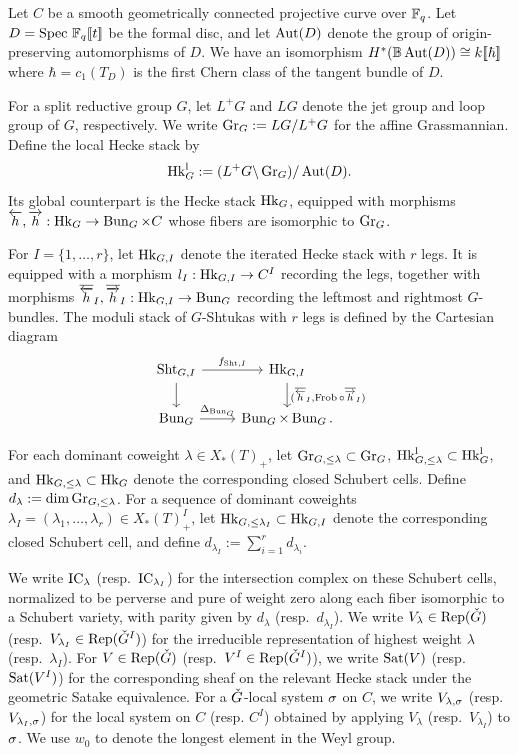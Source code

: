 \documentclass[reqno]{amsart}
\numberwithin{equation}{section}
\numberwithin{equation}{section}
\begin{document}
Let $C$ be a smooth geometrically connected projective curve over $\mathbb{F}_q$. Let $D=\operatorname{Spec\,} \mathbb{F}_q[\![t]\!]$ be the formal disc, and let $\operatorname{Aut}(D)$ denote the group of origin-preserving automorphisms of $D$. We have an isomorphism $H^*(\mathbb{B}\operatorname{Aut}(D))\cong k[\![\hbar]\!]$ where $\hbar=c_1(T_D)$ is the first Chern class of the tangent bundle of $D$.

For a split reductive group $G$, let $L^+G$ and $LG$ denote the jet group and loop group of $G$, respectively. We write $\operatorname{Gr}_G:=LG/L^+G$ for the affine Grassmannian. Define the local Hecke stack by
\[
\operatorname{Hk}_G^{\mathrm{l}}:=(L^+G\backslash \operatorname{Gr}_G)/\operatorname{Aut}(D).
\]
Its global counterpart is the Hecke stack $\operatorname{Hk}_G$, equipped with morphisms $\overleftarrow{h},\overrightarrow{h}:\operatorname{Hk}_G\to \operatorname{Bun}_G\times C$ whose fibers are isomorphic to $\operatorname{Gr}_G$.

For $I=\{1,\dots,r\}$, let $\operatorname{Hk}_{G,I}$ denote the iterated Hecke stack with $r$ legs. It is equipped with a morphism $l_I:\operatorname{Hk}_{G,I}\to C^I$ recording the legs, together with morphisms $\overline{\overleftarrow{h}}_I,\overline{\overrightarrow{h}}_I:\operatorname{Hk}_{G,I}\to \operatorname{Bun}_G$ recording the leftmost and rightmost $G$-bundles. The moduli stack of $G$-Shtukas with $r$ legs is defined by the Cartesian diagram
\[
\begin{tikzcd}
    \Sht_{G,I} \ar[r, "f_{\Sht,I}"] \ar[d]
    & \Hk_{G,I} \ar[d, "{(\overline{\lh}_I,\Frob\circ \overline{\rh}_I)}"] \\
    \Bun_G \ar[r, "\Delta_{\Bun_G}"]
    & \Bun_G\times\Bun_G.
\end{tikzcd}
\]

For each dominant coweight $\lambda\in X_*(T)_+$, let $\operatorname{Gr}_{G,\leq\lambda}\subset \operatorname{Gr}_G$, $\operatorname{Hk}_{G,\leq \lambda}^{\mathrm{l}}\subset \operatorname{Hk}_G^{\mathrm{l}}$, and $\operatorname{Hk}_{G,\leq\lambda}\subset \operatorname{Hk}_G$ denote the corresponding closed Schubert cells. Define $d_{\lambda}:=\dim \operatorname{Gr}_{G,\leq\lambda}$. For a sequence of dominant coweights $\lambda_I=(\lambda_1,\dots,\lambda_r)\in X_*(T)_+^I$, let $\operatorname{Hk}_{G,\leq\lambda_I}\subset \operatorname{Hk}_{G,I}$ denote the corresponding closed Schubert cell, and define $d_{\lambda_I}:=\sum_{i=1}^r d_{\lambda_i}$.

We write $\operatorname{IC}_{\lambda}$ (resp.\ $\operatorname{IC}_{\lambda_I}$) for the intersection complex on these Schubert cells, normalized to be perverse and pure of weight zero along each fiber isomorphic to a Schubert variety, with parity given by $d_{\lambda}$ (resp.\ $d_{\lambda_I}$). We write $V_{\lambda}\in \operatorname{Rep}(\check{G})$ (resp.\ $V_{\lambda_I}\in \operatorname{Rep}(\check{G}^I)$) for the irreducible representation of highest weight $\lambda$ (resp.\ $\lambda_I$). For $V\in \operatorname{Rep}(\check{G})$ (resp.\ $V^I\in \operatorname{Rep}(\check{G}^I)$), we write $\operatorname{Sat}(V)$ (resp.\ $\operatorname{Sat}(V^I)$) for the corresponding sheaf on the relevant Hecke stack under the geometric Satake equivalence. For a $\check{G}$-local system $\sigma$ on $C$, we write $V_{\lambda,\sigma}$ (resp.\ $V_{\lambda_I,\sigma}$) for the local system on $C$ (resp. $C^I$) obtained by applying $V_{\lambda}$ (resp.\ $V_{\lambda_I}$) to $\sigma$. We use $w_0$ to denote the longest element in the Weyl group.
\end{document}
